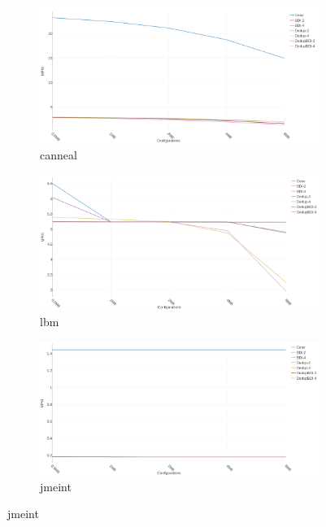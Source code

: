 \begin{figure}
    \begin{subfigure}{0.5\textwidth}
        \includegraphics[width=\textwidth]{canneal-mpki.png}
        \caption{canneal}
    \end{subfigure}
    \begin{subfigure}{0.5\textwidth}
        \includegraphics[width=\textwidth]{lbm-mpki.png}
        \caption{lbm}
    \end{subfigure}
    \begin{subfigure}{0.5\textwidth}
        \includegraphics[width=\textwidth]{jmeint-mpki.png}
        \caption{jmeint}
    \end{subfigure}

\end{figure}
